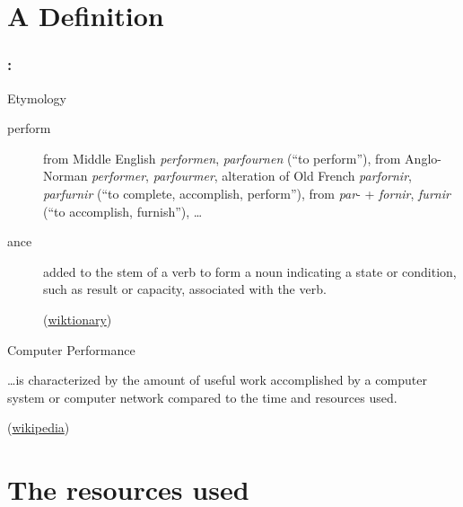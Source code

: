 \documentclass[9pt,xcolor=table]{beamer}
\begin{document}
\section{A Definition}
\begin{frame}
\frametitle{\insertsectionhead{} : \insertpart{}
}
\vfill
\begin{block}{Etymology}
  \begin{description}
  \item[perform] from Middle English \textit{performen}, \textit{parfournen} (``to perform''), from Anglo-Norman \textit{performer}, \textit{parfourmer}, alteration of Old French \textit{parfornir}, \textit{parfurnir} (``to complete, accomplish, perform''), from \textit{par}- + \textit{fornir}, \textit{furnir} (``to accomplish, furnish''), \dots
  \item[ance] added to the stem of a verb to form a noun indicating a state or condition, such as result or capacity, associated with the verb.\\
    \begin{flushright}
      \small(\href{http://en.wiktionary.org/wiki/perform}{wiktionary})
    \end{flushright}
  \end{description}
\end{block}
\vfill
\begin{block}{Computer Performance}
  \begin{center}
    \dots is characterized by the amount of \alert<2->{useful work} accomplished by a computer system or computer network compared to the \alert<3->{time} and \alert<4->{resources} used.\\
  \end{center}
  \begin{flushright}
    \small(\href{http://en.wikipedia.org/wiki/Computer_performance}{wikipedia})
  \end{flushright}

  \end{block}
\vfill
\end{frame}

\section[Resources]{The resources used}
\end{document}
